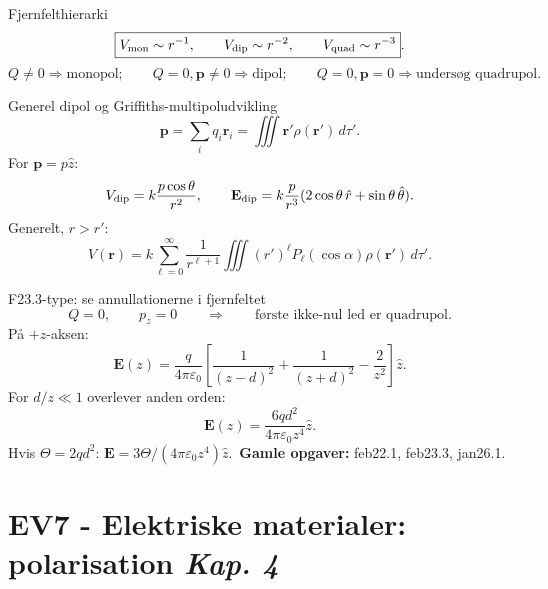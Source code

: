 \documentclass[10pt,a4paper]{article}
\newcommand{\chaptertag}[1]{\hfill{\footnotesize\color{black!50}\textit{#1}}}
\begin{document}
\begin{quickbox}{Fjernfelthierarki}
\[
 \boxed{V_{\rm mon}\sim r^{-1},\qquad V_{\rm dip}\sim r^{-2},\qquad V_{\rm quad}\sim r^{-3}}.
\]
\[
 Q\neq0\Rightarrow\text{monopol};\qquad Q=0,\mathbf p\neq0\Rightarrow\text{dipol};\qquad Q=0,\mathbf p=0\Rightarrow\text{undersøg quadrupol}.
\]
\end{quickbox}

\begin{casebox}{Generel dipol og Griffiths-multipoludvikling}
\[
 \mathbf p=\sum_iq_i\mathbf r_i=\iiint\mathbf r'\rho(\mathbf r')\,d\tau'.
\]
For $\mathbf p=p\hat z$:
\[
 V_{\rm dip}=k\frac{p\cos\theta}{r^2},\qquad
 \mathbf E_{\rm dip}=k\frac{p}{r^3}(2\cos\theta\,\hat r+\sin\theta\,\hat\theta).
\]
Generelt, $r>r'$:
\[
 V(\mathbf r)=k\sum_{\ell=0}^{\infty}\frac{1}{r^{\ell+1}}\iiint (r')^\ell P_\ell(\cos\alpha)\rho(\mathbf r')\,d\tau'.
\]
\end{casebox}

\begin{casebox}{F23.3-type: se annullationerne i fjernfeltet}
\[
 Q=0,\qquad p_z=0\qquad\Rightarrow\qquad\text{første ikke-nul led er quadrupol}.
\]
På $+z$-aksen:
\[
 \mathbf E(z)=\frac{q}{4\pi\varepsilon_0}\left[\frac1{(z-d)^2}+\frac1{(z+d)^2}-\frac{2}{z^2}\right]\hat z.
\]
For $d/z\ll1$ overlever anden orden:
\[
 \boxed{\mathbf E(z)=\frac{6qd^2}{4\pi\varepsilon_0z^4}\hat z}.
\]
Hvis $\Theta=2qd^2$: $\mathbf E=3\Theta/(4\pi\varepsilon_0z^4)\hat z$.\
\textbf{Gamle opgaver:} feb22.1, feb23.3, jan26.1.
\end{casebox}

\newpage
\section*{EV7 - Elektriske materialer: polarisation \chaptertag{Kap. 4}}
\phantomsection
{}
\end{document}
